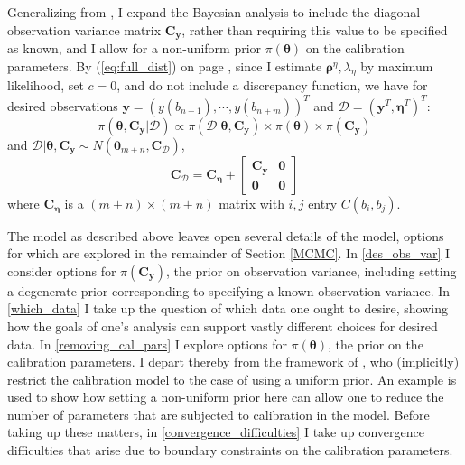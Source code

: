 \documentclass{article}
\begin{document}
Generalizing from \cite{Kennedy2006}, I expand the Bayesian analysis to include the diagonal observation variance matrix $\mathbf C_{\mathbf y}$, rather than requiring this value to be specified as known, and I allow for a non-uniform prior $\pi(\boldsymbol \theta)$ on the calibration parameters. By (\ref{eq:full_dist}) on page \pageref{eq:full_dist}, 
since I estimate $\boldsymbol \rho^\eta,\lambda_\eta$ by maximum likelihood, set $c=0$, and do not include a discrepancy function, we have for desired observations $\mathbf y=(y (b_{n+1}),\cdots,y(b_{n+m}))^T$ and $\mathcal D=(\mathbf y^T, \boldsymbol\eta^T)^T$:
\begin{equation}\label{eq:the_model}
\pi(\boldsymbol \theta,\mathbf C_{\mathbf y}|\mathcal D) \propto \pi (\mathcal D|\boldsymbol \theta,\mathbf C_{\mathbf y})\times \pi(\boldsymbol \theta)\times \pi(\mathbf C_{\mathbf y})
\end{equation}
and $\mathcal D|\boldsymbol \theta,\mathbf C_{\mathbf y} \sim N(\boldsymbol 0_{m+n}, \mathbf C_{\mathcal D})$, 
\begin{equation}\label{eq:the_covariance}
\mathbf C_{\mathcal D} = \mathbf C_{\boldsymbol\eta} + 
\begin{bmatrix}
\mathbf C_{\mathbf y} & \boldsymbol 0\\ 
\boldsymbol 0 & \boldsymbol 0
\end{bmatrix}
\end{equation}
where $\mathbf C_{\boldsymbol\eta}$ is a $(m+n)\times(m+n)$ matrix with $i,j$ entry $C(b_i,b_j)$.

The model as described above leaves open several details of the model, options for which are explored in the remainder of Section \ref{MCMC}. In \ref{des_obs_var} I consider options for $\pi(\mathbf C_{\mathbf y})$, the prior on observation variance, including setting a degenerate prior corresponding to specifying a known observation variance. In \ref{which_data} I take up the question of which data one ought to desire, showing how the goals of one's analysis can support vastly different choices for desired data. In \ref{removing_cal_pars} I explore options for $\pi(\boldsymbol \theta)$, the prior on the calibration parameters. I depart thereby from the framework of \cite{Kennedy2006}, who (implicitly) restrict the calibration model to the case of using a uniform prior. An example is used to show how setting a non-uniform prior here can allow one to reduce the number of parameters that are subjected to calibration in the model. Before taking up these matters, in \ref{convergence_difficulties} I take up convergence difficulties that arise due to boundary constraints on the calibration parameters.
\end{document}
